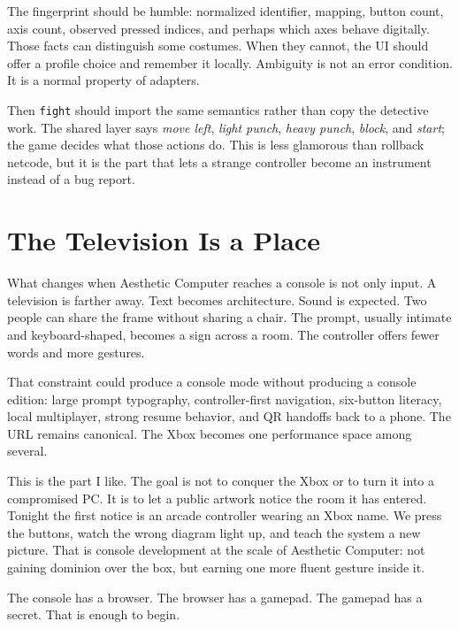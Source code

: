 \documentclass[11pt,letterpaper]{article}
\begin{document}
The fingerprint should be humble: normalized identifier, mapping, button count, axis count, observed pressed indices, and perhaps which axes behave digitally. Those facts can distinguish some costumes. When they cannot, the UI should offer a profile choice and remember it locally. Ambiguity is not an error condition. It is a normal property of adapters.

Then \texttt{fight} should import the same semantics rather than copy the detective work. The shared layer says \emph{move left}, \emph{light punch}, \emph{heavy punch}, \emph{block}, and \emph{start}; the game decides what those actions do. This is less glamorous than rollback netcode, but it is the part that lets a strange controller become an instrument instead of a bug report.

\section{The Television Is a Place}

What changes when Aesthetic Computer reaches a console is not only input. A television is farther away. Text becomes architecture. Sound is expected. Two people can share the frame without sharing a chair. The prompt, usually intimate and keyboard-shaped, becomes a sign across a room. The controller offers fewer words and more gestures.

That constraint could produce a console mode without producing a console edition: large prompt typography, controller-first navigation, six-button literacy, local multiplayer, strong resume behavior, and QR handoffs back to a phone. The URL remains canonical. The Xbox becomes one performance space among several.

This is the part I like. The goal is not to conquer the Xbox or to turn it into a compromised PC. It is to let a public artwork notice the room it has entered. Tonight the first notice is an arcade controller wearing an Xbox name. We press the buttons, watch the wrong diagram light up, and teach the system a new picture. That is console development at the scale of Aesthetic Computer: not gaining dominion over the box, but earning one more fluent gesture inside it.

The console has a browser. The browser has a gamepad. The gamepad has a secret. That is enough to begin.

\end{document}
